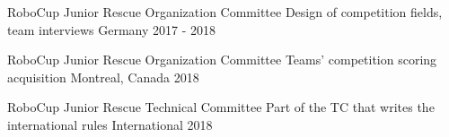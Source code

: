 
\begin{cvhonors}

  \cvhonor
    {RoboCup Junior Rescue Organization Committee} %
    {Design of competition fields, team interviews} %
    {Germany} %
    {2017 - 2018} %
    
  \cvhonor
    {RoboCup Junior Rescue Organization Committee} %
    {Teams' competition scoring acquisition} %
    {Montreal, Canada} %
    {2018} %

  \cvhonor
    {RoboCup Junior Rescue Technical Committee} %
    {Part of the TC that writes the international rules} %
    {International} %
    {2018} %


\end{cvhonors}
